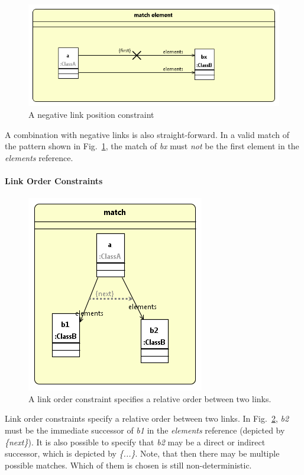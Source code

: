 {

\begin{figure}[htb]
\center
\includegraphics[width=0.75\columnwidth]{figures/linkPositionConstraint2.png}
\caption{A negative link position constraint}
\label{fig:linkPositionConstraints:linkPositionConstraint2}
\end{figure}

A combination with negative links is also straight-forward. In a valid match of the pattern shown in Fig.~\ref{fig:linkPositionConstraints:linkPositionConstraint2}, the match of \emph{bx} must \emph{not} be the first element in the \emph{elements} reference.

\paragraph{Link Order Constraints}

\begin{figure}
\center
\includegraphics[width=0.4\columnwidth]{figures/linkOrderConstraint1.png}
\caption{A link order constraint specifies a relative order between two links.}
\label{fig:linkOrderConstraints:linkOrderConstaint1}
\end{figure}

Link order constraints specify a relative order between two links. In Fig.~\ref{fig:linkOrderConstraints:linkOrderConstaint1}, \emph{b2} must be the immediate successor of \emph{b1} in the \emph{elements} reference (depicted by \emph{\{next\}}). It is also possible to specify that \emph{b2} may be a direct or indirect successor, which is depicted by \emph{\{...\}}. Note, that then there may be multiple possible matches. Which of them is chosen is still non-deterministic.

}
